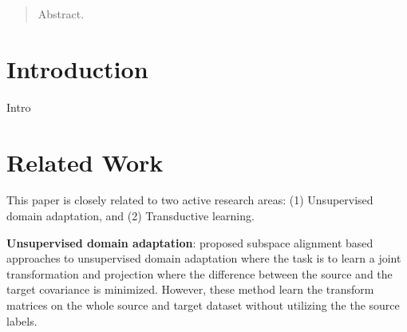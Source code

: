 \documentclass{article}
\begin{document}
 


\begin{abstract} 
Abstract.
\end{abstract} 

\section{Introduction}
\label{intro}
Intro

\section{Related Work} 

This paper is closely related to two active research areas: (1) Unsupervised domain adaptation, and (2) Transductive learning.

\textbf{Unsupervised domain adaptation}: \cite{gong12, baochen15, fernando13, baochen16} proposed subspace alignment based approaches to unsupervised domain adaptation where the task is to learn a joint transformation and projection where the difference between the source and the target covariance is minimized. However, these method learn the transform matrices on the whole source and target dataset without utilizing the the source labels. 
\end{document}
